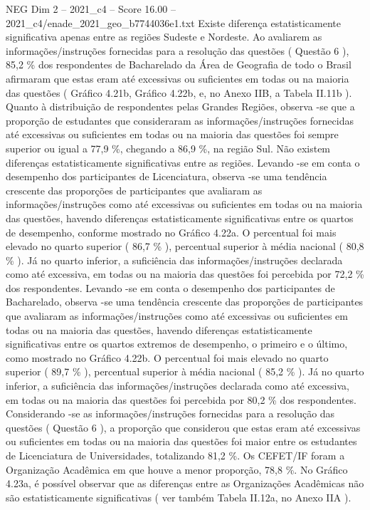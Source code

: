 \begin{textsample}{NEG Dim 2 – 2021\_c4 – Score 16.00 – 2021\_c4/enade\_2021\_geo\_b7744036e1.txt}
Existe diferença estatisticamente significativa apenas entre as regiões Sudeste e Nordeste.
Ao avaliarem as informações/instruções fornecidas para a resolução das questões ( Questão 6 ), 85,2 \% dos respondentes de Bacharelado da Área de Geografia de todo o Brasil afirmaram que estas eram até excessivas ou suficientes em todas ou na maioria das questões ( Gráfico 4.21b, Gráfico 4.22b, e, no Anexo IIB, a Tabela II.11b ).
Quanto à distribuição de respondentes pelas Grandes Regiões, observa -se que a proporção de estudantes que consideraram as informações/instruções fornecidas até excessivas ou suficientes em todas ou na maioria das questões foi sempre superior ou igual a 77,9 \%, chegando a 86,9 \%, na região Sul.
Não existem diferenças estatisticamente significativas entre as regiões.
Levando -se em conta o desempenho dos participantes de Licenciatura, observa -se uma tendência crescente das proporções de participantes que avaliaram as informações/instruções como até excessivas ou suficientes em todas ou na maioria das questões, havendo diferenças estatisticamente significativas entre os quartos de desempenho, conforme mostrado no Gráfico 4.22a.
O percentual foi mais elevado no quarto superior ( 86,7 \% ), percentual superior à média nacional ( 80,8 \% ).
Já no quarto inferior, a suficiência das informações/instruções declarada como até excessiva, em todas ou na maioria das questões foi percebida por 72,2 \% dos respondentes.
Levando -se em conta o desempenho dos participantes de Bacharelado, observa -se uma tendência crescente das proporções de participantes que avaliaram as informações/instruções como até excessivas ou suficientes em todas ou na maioria das questões, havendo diferenças estatisticamente significativas entre os quartos extremos de desempenho, o primeiro e o último, como mostrado no Gráfico 4.22b.
O percentual foi mais elevado no quarto superior ( 89,7 \% ), percentual superior à média nacional ( 85,2 \% ).
Já no quarto inferior, a suficiência das informações/instruções declarada como até excessiva, em todas ou na maioria das questões foi percebida por 80,2 \% dos respondentes.
Considerando -se as informações/instruções fornecidas para a resolução das questões ( Questão 6 ), a proporção que considerou que estas eram até excessivas ou suficientes em todas ou na maioria das questões foi maior entre os estudantes de Licenciatura de Universidades, totalizando 81,2 \%.
Os CEFET/IF foram a Organização Acadêmica em que houve a menor proporção, 78,8 \%.
No Gráfico 4.23a, é possível observar que as diferenças entre as Organizações Acadêmicas não são estatisticamente significativas ( ver também Tabela II.12a, no Anexo IIA ).

\end{textsample}
